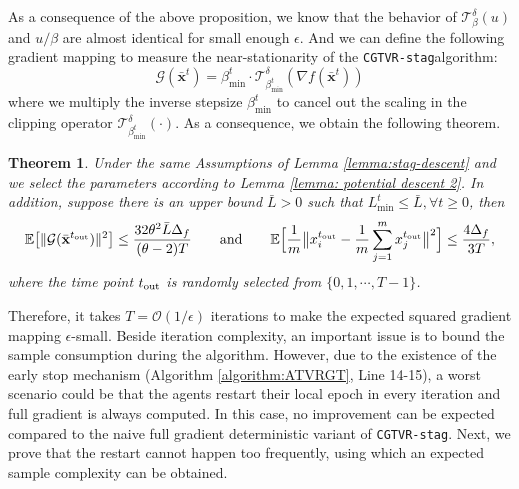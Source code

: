 \documentclass{article}
\newtheorem{theorem}{Theorem}[section]
\newcommand{\cG}{\mathcal{G}}
\newcommand{\cT}{\mathcal{T}}
\newcommand{\bbxt}{\bar{\mathbf{x}}^t}
\newcommand{\EE}{\mathbb{E}}
\begin{document}
As a consequence of the above proposition, we know that the behavior of $\cT_\beta^\delta(u)$ and $u/\beta$ are almost identical for small enough $\epsilon$. And we can define the following gradient mapping to measure the near-stationarity of the \texttt{CGTVR-stag}algorithm: 
\begin{equation}\label{defn:GradMap}
\cG(\bbxt) = \beta_{\min}^t\cdot\cT_{\beta_{\min}^t}^\delta(\nabla f(\bbxt))
\end{equation}
where we multiply the inverse stepsize $\beta_{\min}^t$ to cancel out the scaling in the clipping operator $\cT_{\beta_{\min}^t}^\delta(\cdot)$. As a consequence, we obtain the following theorem. 

\begin{theorem}\label{theorem:Iter-Complexity-Bounded-L}
Under the same Assumptions of Lemma \ref{lemma:stag-descent} and we select the parameters according to Lemma \ref{lemma: potential descent 2}. In addition, suppose there is an upper bound $\bar{L}>0$ such that $L_{\min}^t\leq\bar{L}, \forall t\geq0$, then  
\begin{equation}
    \label{thm:Iter-Comp-Bounded-L-0}
    \EE\big[\|\cG(\bar{\bf x}^{t_{\rm out}})\|^2\big] \leq \frac{32\theta^2\bar{L}\Delta_f}{(\theta-2)T}\qquad\mbox{and}\qquad\EE\Big[\frac{1}{m}\big\|x^{t_{\rm out}}_i-\frac{1}{m}\sum_{j=1}^mx_j^{t_{\rm out}}\big\|^2\Big]\leq\frac{4\Delta_f}{3T},
\end{equation}
where the time point $t_{\rm out}$ is randomly selected from $\{0,1,\cdots, T-1\}$.
\end{theorem}

Therefore, it takes $T=\mathcal{O}(1/\epsilon)$ iterations to make the expected squared gradient mapping $\epsilon$-small. 
Beside iteration complexity, an important issue is to bound the sample consumption during the algorithm. However, due to the existence of the early stop mechanism (Algorithm \ref{algorithm:ATVRGT}, Line 14-15), a worst scenario could be that the agents restart their local epoch in every iteration and full gradient is always computed. In this case, no improvement can be expected compared to the naive full gradient deterministic variant of \texttt{CGTVR-stag}. Next, we prove that the restart cannot happen too frequently, using which an expected sample complexity can be obtained. 
\end{document}
